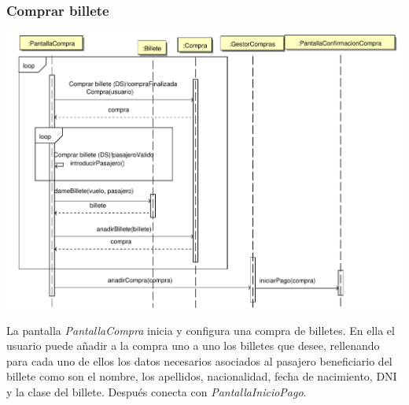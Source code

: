 \documentclass[11pt, a4paper, twoside, titlepage]{article}
\begin{document}
			\subsubsection{Comprar billete}
				\begin{center}
					\includegraphics[scale=.67]{diseno/diagramas/comprarbillete.pdf}
				\end{center}
				La pantalla {\itshape PantallaCompra} inicia y configura una compra de billetes.
				En ella el usuario puede añadir a la compra uno a uno los billetes que desee, rellenando para cada uno de ellos los datos necesarios asociados al pasajero beneficiario del billete como son el nombre, los apellidos, nacionalidad, fecha de nacimiento, DNI y la clase del billete. Después conecta con {\itshape PantallaInicioPago}.
			
\end{document}
